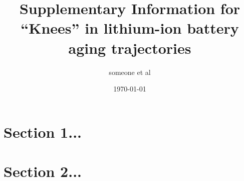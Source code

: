 \documentclass[journal=jpclcd,manuscript=article]{achemso}
\title{{\large{\bfseries{Supplementary Information for}}} \\ \Large\bfseries ``Knees'' in lithium-ion battery aging trajectories}
\author{someone et al}
\date{\today}
\begin{document}
\maketitle
\thispagestyle{empty}


 
 
 

\section{Section 1...}

\cite{strange_elbows_2021}










\section{Section 2...}







% 

\end{document}

